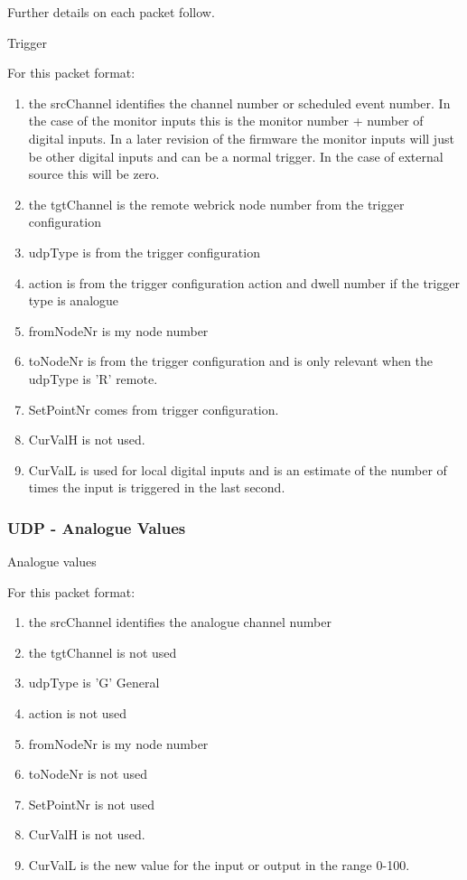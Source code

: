 Further details on each packet follow.
	
Trigger

For this packet format:

\begin{enumerate}
\item the srcChannel identifies the channel number or scheduled event number. In the case of the monitor
inputs this is the monitor number + number of digital inputs. In a later revision of the firmware the monitor inputs will
just be other digital inputs and can be a normal trigger. In the case of external source this will be zero.
\item  the tgtChannel is the remote webrick node number from the trigger configuration
\item  udpType is from the trigger configuration
\item  action is from the trigger configuration action and dwell number if the trigger type is analogue
\item  fromNodeNr is my node number
\item  toNodeNr is from the trigger configuration and is only relevant when the udpType is 'R' remote.
\item  SetPointNr comes from trigger configuration.
\item  CurValH is not used.
\item  CurValL is used for local digital inputs and is an estimate of the number of times the input is triggered
	in the last second.\\
\end{enumerate}

\subsubsection{UDP - Analogue Values}
Analogue values


For this packet format:
\begin{enumerate}
\item  the srcChannel identifies the analogue channel number
\item  the tgtChannel is not used
\item  udpType is 'G' General
\item  action is not used
\item  fromNodeNr is my node number
\item  toNodeNr is not used
\item  SetPointNr is not used
\item  CurValH is not used.
\item  CurValL is the new value for the input or output in the range 0-100.\\
\end{enumerate}


